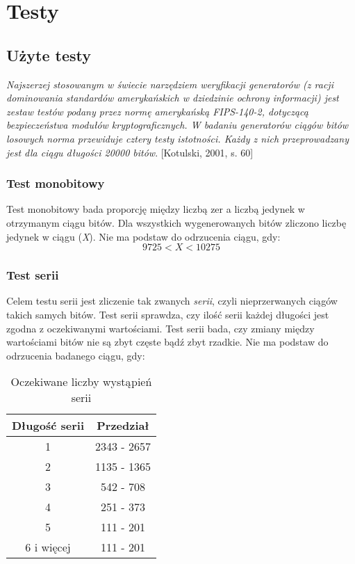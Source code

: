 \chapter{Testy}

\section{Użyte testy}

\textit{Najszerzej stosowanym w świecie narzędziem weryfikacji generatorów
(z racji dominowania standardów amerykańskich w dziedzinie ochrony informacji) jest zestaw testów podany przez normę 
amerykańską FIPS-140-2, dotyczącą bezpieczeństwa modułów kryptograficznych. W badaniu generatorów ciągów bitów losowych 
norma przewiduje cztery testy istotności. Każdy z nich przeprowadzany jest dla ciągu długości 20000 bitów}.
[Kotulski, 2001, s. 60]

\subsection{Test monobitowy}
Test monobitowy bada proporcję między liczbą zer a liczbą jedynek w otrzymanym ciągu bitów. Dla wszystkich 
wygenerowanych bitów zliczono liczbę jedynek w ciągu (\textit{X}). Nie ma podstaw do odrzucenia ciągu, gdy:
\begin{displaymath}
    9725 < X < 10275
\end{displaymath}

\subsection{Test serii}
Celem testu serii jest zliczenie tak zwanych \textit{serii}, czyli nieprzerwanych ciągów takich samych bitów. Test serii
sprawdza, czy ilość serii każdej długości jest zgodna z oczekiwanymi wartościami. Test serii bada, czy zmiany między 
wartościami bitów nie są zbyt częste bądź zbyt rzadkie. Nie ma podstaw do odrzucenia badanego ciągu, gdy:
\begin{table}
    \centering
    \begin{tabular}{|c|c|} 
        \hline
        Długość serii & Przedział \\
        \hline
        1 & 2343 - 2657 \\
        \hline
        2 & 1135 - 1365 \\
        \hline
        3 & 542 - 708 \\
        \hline
        4 & 251 - 373 \\
        \hline
        5 & 111 - 201 \\
        \hline
        6 i więcej & 111 - 201 \\
        \hline  
    \end{tabular} 
    \caption{Oczekiwane liczby wystąpień serii}
\end{table}   
